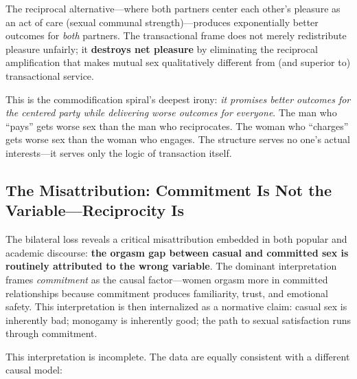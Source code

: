 \documentclass[12pt,openany]{book}
\numberwithin{equation}{chapter}
\begin{document}
The reciprocal alternative---where both partners center each other's pleasure as an act of care (sexual communal strength)---produces exponentially better outcomes for \textit{both} partners. The transactional frame does not merely redistribute pleasure unfairly; it \textbf{destroys net pleasure} by eliminating the reciprocal amplification that makes mutual sex qualitatively different from (and superior to) transactional service.

This is the commodification spiral's deepest irony: \textit{it promises better outcomes for the centered party while delivering worse outcomes for everyone}. The man who ``pays'' gets worse sex than the man who reciprocates. The woman who ``charges'' gets worse sex than the woman who engages. The structure serves no one's actual interests---it serves only the logic of transaction itself.

\subsection{The Misattribution: Commitment Is Not the Variable---Reciprocity Is}

The bilateral loss reveals a critical misattribution embedded in both popular and academic discourse: \textbf{the orgasm gap between casual and committed sex is routinely attributed to the wrong variable}. The dominant interpretation frames \textit{commitment} as the causal factor---women orgasm more in committed relationships because commitment produces familiarity, trust, and emotional safety. This interpretation is then internalized as a normative claim: casual sex is inherently bad; monogamy is inherently good; the path to sexual satisfaction runs through commitment.

This interpretation is incomplete. The data are equally consistent with a different causal model:
\end{document}
